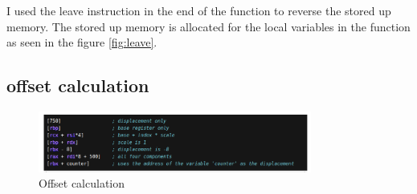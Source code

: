 \documentclass{article}
\begin{document}
I used the leave instruction in the end of the function to reverse the stored up memory. The stored up memory is allocated for the local variables in the function as seen in the figure \ref{fig:leave}.

\subsection{offset calculation}
\begin{figure}[H]
    \centering
    \includegraphics[width=0.8\textwidth]{offset.png}
    \caption{Offset calculation}
    \label{fig:offset}
\end{figure}
\end{document}
